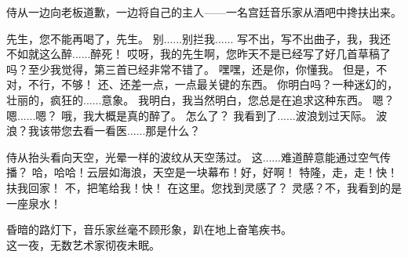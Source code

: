\documentclass[openany]{book}
\begin{document}
侍从一边向老板道歉，一边将自己的主人——一名宫廷音乐家从酒吧中搀扶出来。
\begin{dialogue}
     先生，您不能再喝了，先生。
     别......别拦我......
     写不出，写不出曲子，我，我还不如就这么醉......醉死！
     哎呀，我的先生啊，您昨天不是已经写了好几首草稿了吗？至少我觉得，第三首已经非常不错了。
     嘿嘿，还是你，你懂我。
     但是，不对，不行，不够！
     还、还差一点，一点最关键的东西。
     你明白吗？一种迷幻的，壮丽的，疯狂的......意象。
     我明白，我当然明白，您总是在追求这种东西。
     嗯？嗯......嗯？
     哦，我大概是真的醉了。
     怎么了？
     我看到了......波浪划过天际。
     波浪？我该带您去看一看医......那是什么？\par
    侍从抬头看向天空，光晕一样的波纹从天空荡过。
     这......难道醉意能通过空气传播？
     哈，哈哈！云层如海浪，天空是一块幕布！好，好啊！
     特隆，走，走！快！扶我回家！
     不，把笔给我！快！
     在这里。您找到灵感了？
     灵感？不，我看到的是一座泉水！\par
    昏暗的路灯下，音乐家丝毫不顾形象，趴在地上奋笔疾书。\\
    这一夜，无数艺术家彻夜未眠。
\end{dialogue}
\end{document}
